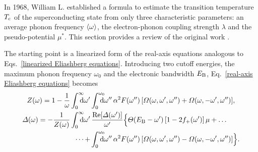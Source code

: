 In 1968, William L.  established a formula to estimate the
transition temperature $T \sb{\text{c}}$ of the superconducting state from only three
characteristic parameters: an average phonon frequency $\langle\omega\rangle$, the
electron-phonon coupling strength $\lambda$ and the 
pseudo-potential $\mu^*$. This section provides a review of the original work
\cite{McMillan68}.

The starting point is a linearized form of the real-axis 
equations analogous to Eqs.~\ref{linearized Eliashberg equations}. Introducing
two cutoff energies, the maximum phonon frequency $\omega_0$ and the electronic
bandwidth $E \sb{\text{B}}$, Eq.~\ref{real-axis Eliashberg equations} becomes
%
\begin{align*}
    Z(\omega) = 1 - \frac 1 \omega
    \int \from 0 \till \infty \D \omega'
    &\int \from 0 \till{\omega_0} \D \omega'' \, \alpha^2 F(\omega'') \,
    [\Omega(\omega, \omega', \omega'') + \Omega(\omega, -\omega', \omega'')],
    \\
    \Delta(\omega) = -\frac 1 {Z(\omega)}
    \int \from 0 \till \infty \D \omega' \,
    \!&\,\frac{\Re[\Delta(\omega')]}{\omega'}
    \Big \{
        \Theta(E \sub B - \omega') \, [1 - 2 f_+(\omega')] \, \mu
        + \dots
        \\
        \dots +
        &\int \from 0 \till{\omega_0} \D \omega'' \, \alpha^2 F(\omega'') \,
        [\Omega(\omega, \omega', \omega'') - \Omega(\omega, -\omega', \omega'')]
    \Big \}.
\end{align*}

